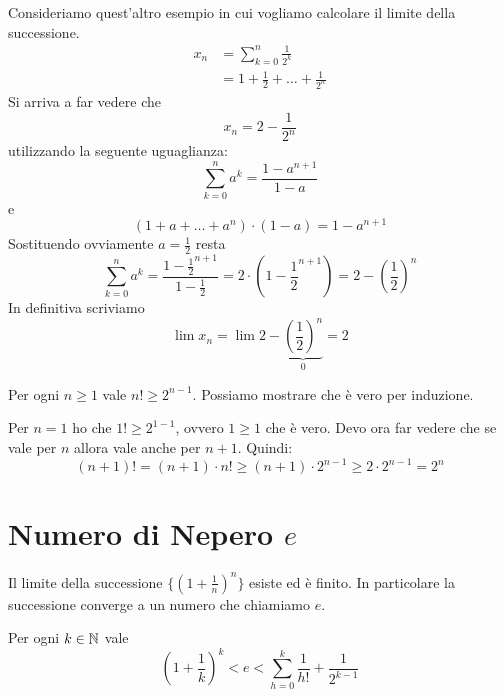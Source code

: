 \begin{example}
Consideriamo quest'altro esempio in cui vogliamo calcolare il limite della successione.
\begin{align*}
x_n &= \sum_{k=0}^n \frac{1}{2^k} \\
&= 1 + \frac{1}{2} + \ldots + \frac{1}{2^n}
\end{align*}
Si arriva a far vedere che 
\begin{equation*}
x_n = 2 - \frac{1}{2^n}
\end{equation*}
utilizzando la seguente uguaglianza:
\begin{equation*}
\sum_{k=0}^n a^k = \frac{1-a^{n+1}}{1-a}
\end{equation*}
e
\begin{equation*}
(1 + a + \ldots + a^n)\cdot (1-a) = 1 - a^{n+1}
\end{equation*}
Sostituendo ovviamente $a = \frac{1}{2}$ resta
\begin{equation*}
\sum_{k=0}^n a^k = \frac{1-\frac{1}{2}^{n+1}}{1-\frac{1}{2}} = 2 \cdot \left(1 - \frac{1}{2}^{n+1} \right) = 2 - \left(\frac{1}{2}\right)^n
\end{equation*}
In definitiva scriviamo
\begin{equation*}
\lim x_n = \lim 2 - \underbrace{\left(\frac{1}{2}\right)^n}_{0} = 2
\end{equation*}
\end{example}

\begin{remark}
Per ogni $n \ge 1$ vale $n! \ge 2^{n-1}$. Possiamo mostrare che è vero per induzione.

Per $n = 1$ ho che $1! \ge 2^{1-1}$, ovvero $1 \ge 1$ che è vero. Devo ora far vedere che se vale per $n$ allora vale anche per $n + 1$. Quindi:
\begin{equation*}
(n+1)! = (n+1)\cdot n! \ge (n+1) \cdot 2^{n-1} \ge 2 \cdot 2^{n-1} = 2^n
\end{equation*}
\end{remark}

\section{Numero di Nepero $e$}

\begin{theorem}
Il limite della successione $\{(1+\frac{1}{n})^n\}$ esiste ed è finito. In particolare la successione converge a un numero che chiamiamo $e$.

Per ogni $k \in \mathbb N$ vale
\begin{equation*}
\left(1+\frac{1}{k}\right)^k < e < \sum_{h = 0}^k \frac{1}{h!} + \frac{1}{2^{k-1}}
\end{equation*}
\end{theorem}

